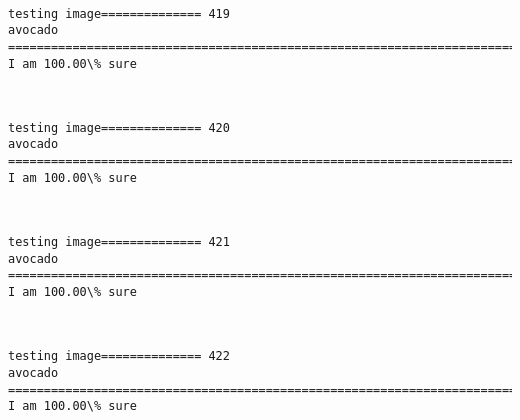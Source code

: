 \documentclass[11pt]{article}
\begin{document}
    \begin{center}
    \end{center}
    { \hspace*{\fill} \\}
    
    \begin{Verbatim}[commandchars=\\\{\}]
testing image============== 419
avocado
============================================================================
I am 100.00\% sure

    \end{Verbatim}

    \begin{center}
    \end{center}
    { \hspace*{\fill} \\}
    
    \begin{Verbatim}[commandchars=\\\{\}]
testing image============== 420
avocado
============================================================================
I am 100.00\% sure

    \end{Verbatim}

    \begin{center}
    \end{center}
    { \hspace*{\fill} \\}
    
    \begin{Verbatim}[commandchars=\\\{\}]
testing image============== 421
avocado
============================================================================
I am 100.00\% sure

    \end{Verbatim}

    \begin{center}
    \end{center}
    { \hspace*{\fill} \\}
    
    \begin{Verbatim}[commandchars=\\\{\}]
testing image============== 422
avocado
============================================================================
I am 100.00\% sure

    \end{Verbatim}
\end{document}
